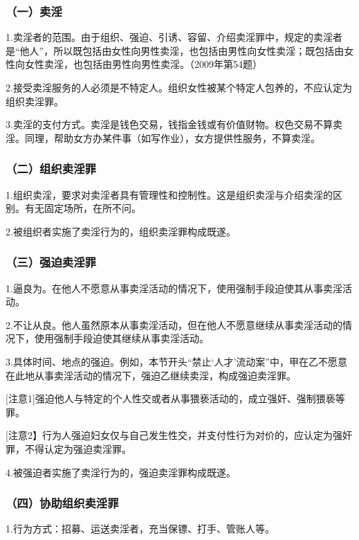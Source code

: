 \subsubsection*{（一）卖淫}

1.卖淫者的范围。由于组织、强迫、引诱、容留、介绍卖淫罪中，规定的卖淫者是“他人”，所以既包括由女性向男性卖淫，也包括由男性向女性卖淫；既包括由女性向女性卖淫，也包括由男性向男性卖淫。（2009年第54题）

2.接受卖淫服务的人必须是不特定人。组织女性被某个特定人包养的，不应认定为组织卖淫罪。

3.卖淫的支付方式。卖淫是钱色交易，钱指金钱或有价值财物。权色交易不算卖淫。同理，帮助女方办某件事（如写作业），女方提供性服务，不算卖淫。

\subsubsection*{（二）组织卖淫罪}

1.组织卖淫，要求对卖淫者具有管理性和控制性。这是组织卖淫与介绍卖淫的区别。有无固定场所，在所不问。

2.被组织者实施了卖淫行为的，组织卖淫罪构成既遂。

\subsubsection*{（三）强迫卖淫罪}

1.逼良为。在他人不愿意从事卖淫活动的情况下，使用强制手段迫使其从事卖淫活动。

2.不让从良。他人虽然原本从事卖淫活动，但在他人不愿意继续从事卖淫活动的情况下，使用强制手段迫使其继续从事卖淫活动。

3.具体时间、地点的强迫。例如，本节开头“禁止‘人才’流动案”中，甲在乙不愿意在此地从事卖淫活动的情况下，强迫乙继续卖淫，构成强迫卖淫罪。

[注意1]强迫他人与特定的个人性交或者从事猥亵活动的，成立强奸、强制猥亵等罪。

[注意2】行为人强迫妇女仅与自己发生性交，并支付性行为对价的，应认定为强奸罪，不得认定为强迫卖淫罪。

4.被强迫者实施了卖淫行为的，强迫卖淫罪构成既遂。

\subsubsection*{（四）协助组织卖淫罪}

1.行为方式：招募、运送卖淫者，充当保镖、打手、管账人等。

